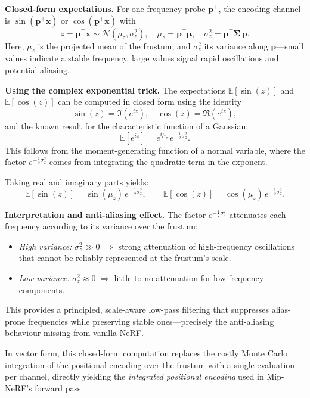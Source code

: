 \begin{enrichment}
\begin{enrichment}
    \medskip
    \noindent
    \textbf{Closed-form expectations.}  
    For one frequency probe $\mathbf{p}^\top$, the encoding channel is $\sin(\mathbf{p}^\top \mathbf{x})$ or $\cos(\mathbf{p}^\top \mathbf{x})$ with
    \[
    z = \mathbf{p}^\top \mathbf{x} \sim \mathcal{N}(\mu_z, \sigma_z^2),
    \quad
    \mu_z = \mathbf{p}^\top \boldsymbol{\mu},
    \quad
    \sigma_z^2 = \mathbf{p}^\top \boldsymbol{\Sigma}\,\mathbf{p}.
    \]
    Here, $\mu_z$ is the projected mean of the frustum, and $\sigma_z^2$ its variance along $\mathbf{p}$—small values indicate a stable frequency, large values signal rapid oscillations and potential aliasing.
    
    \medskip
    \noindent
    \textbf{Using the complex exponential trick.}  
    The expectations $\mathbb{E}[\sin(z)]$ and $\mathbb{E}[\cos(z)]$ can be computed in closed form using the identity
    \[
    \sin(z) = \Im(e^{i z}), \quad \cos(z) = \Re(e^{i z}),
    \]
    and the known result for the characteristic function of a Gaussian:
    \[
    \mathbb{E}[e^{i z}] = e^{i \mu_z} \, e^{-\frac{1}{2} \sigma_z^2}.
    \]
    This follows from the moment-generating function of a normal variable, where the factor $e^{-\frac{1}{2}\sigma_z^2}$ comes from integrating the quadratic term in the exponent.
    
    Taking real and imaginary parts yields:
    \[
    \mathbb{E}[\sin(z)] = \sin(\mu_z)\, e^{-\frac{1}{2} \sigma_z^2},
    \qquad
    \mathbb{E}[\cos(z)] = \cos(\mu_z)\, e^{-\frac{1}{2} \sigma_z^2}.
    \] 
    
    \noindent
    \textbf{Interpretation and anti-aliasing effect.}  
    The factor $e^{-\frac{1}{2} \sigma_z^2}$ attenuates each frequency according to its variance over the frustum:
    \begin{itemize}
        \item \emph{High variance:} $\sigma_z^2 \gg 0$ $\Rightarrow$ strong attenuation of high-frequency oscillations that cannot be reliably represented at the frustum’s scale.
        \item \emph{Low variance:} $\sigma_z^2 \approx 0$ $\Rightarrow$ little to no attenuation for low-frequency components.
    \end{itemize}
    This provides a principled, scale-aware low-pass filtering that suppresses alias-prone frequencies while preserving stable ones—precisely the anti-aliasing behaviour missing from vanilla NeRF.  
    
    In vector form, this closed-form computation replaces the costly Monte Carlo integration of the positional encoding over the frustum with a single evaluation per channel, directly yielding the \emph{integrated positional encoding} used in Mip-NeRF’s forward pass.
        

\end{enrichment}
\end{enrichment}
